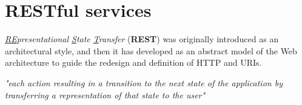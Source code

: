 \newpage
\section{RESTful services}
\begin{paracol}{2}
   \textit{\underline{RE}presentational \underline{S}tate \underline{T}ransfer} (\textbf{REST}) was originally introduced as an architectural
   style, 
   and then it has developed as an abstract model of the
   Web architecture to guide the redesign and
   definition of HTTP and URIs.
   
   \switchcolumn

   \begin{center}
      \textit{
      "each action resulting in a transition
      to the next state of the application by
      transferring a representation of that
      state to the user"}
   \end{center}

\end{paracol}

